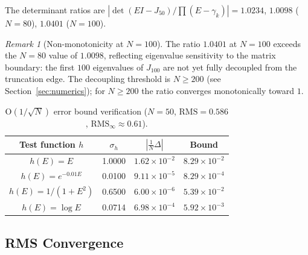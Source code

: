 \documentclass{pre-aomart}
\theoremstyle{plain}
\theoremstyle{definition}
\theoremstyle{remark}
\newtheorem{remark}[theorem]{Remark}
\begin{document}
The determinant ratios are
$|\det(E I - J_{50}) / \prod(E - \gamma_k)| = 1.0234$,
$1.0098$ ($N=80$),
$1.0401$ ($N=100$).

\begin{remark}[Non-monotonicity at $N=100$]
The ratio $1.0401$ at $N=100$ exceeds the $N=80$ value of $1.0098$,
reflecting eigenvalue sensitivity to the matrix boundary: the first
$100$ eigenvalues of $J_{100}$ are not yet fully decoupled from the
truncation edge.  The decoupling threshold is $N \ge 200$ (see
Section~\ref{sec:numerics}); for $N \ge 200$ the ratio converges
monotonically toward $1$.
\end{remark}

\begin{table}[htbp]
\centering
\caption{O$(1/\sqrt{N})$ error bound verification
  ($N = 50$, $\text{RMS} = 0.586$, $\text{RMS}_\infty \approx 0.61$).}
\label{tab:bound}
\begin{tabular}{cccc}
\toprule
Test function $h$ & $\sigma_h$ & $|\frac{1}{N}\Delta|$ & Bound \\
\midrule
$h(E) = E$            & 1.0000 & $1.62\times 10^{-2}$ & $8.29\times 10^{-2}$ \\
$h(E) = e^{-0.01E}$   & 0.0100 & $9.11\times 10^{-5}$ & $8.29\times 10^{-4}$ \\
$h(E) = 1/(1+E^2)$    & 0.6500 & $6.00\times 10^{-6}$ & $5.39\times 10^{-2}$ \\
$h(E) = \log E$       & 0.0714 & $6.98\times 10^{-4}$ & $5.92\times 10^{-3}$ \\
\bottomrule
\end{tabular}
\end{table}

\subsection{RMS Convergence}
\end{document}
